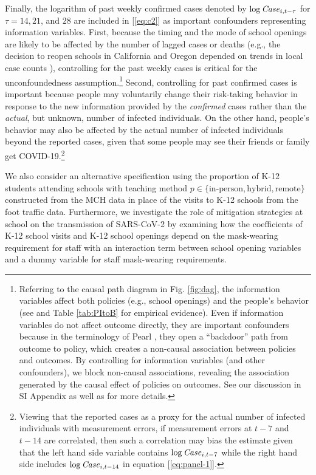 \documentclass[9pt,twocolumn,twoside,lineno]{pnas-new}
\begin{document}
Finally, the logarithm of past weekly confirmed cases denoted by $\log \text{\textit{Case}}_{i,t-\tau}$ for $\tau=14, 21$, and $28$  are included  in [\ref{eq:c2}] as important confounders representing information variables. First, because the timing and the mode of school openings are likely to be affected by the number of lagged cases or deaths (e.g., the decision to reopen schools in California and Oregon depended on trends in local case counts \citep{Goldhaber-Fiebert2020}), controlling for the past weekly cases is critical for the unconfoundedness assumption.\footnote{Referring to the causal path diagram in Fig. \ref{fig:dag}, the information variables affect both policies (e.g., school openings) and  the people's behavior (see \cite{chernozhukov2021} and Table \ref{tab:PItoB} for empirical evidence). Even if information variables do not affect outcome directly, they are important confounders because in the terminology of Pearl \cite{pearl:causality}, they open a ``backdoor'' path from outcome to policy, which creates a non-causal association between policies and outcomes. By controlling for information variables (and other confounders), we block non-causal associations, revealing the association generated by the causal effect of policies on outcomes. See our discussion in SI Appendix as well as \cite{pearl:causality} for more details.} Second, controlling for past confirmed cases is important because people may voluntarily change their risk-taking behavior in response to the new information provided by the \textit{confirmed} cases rather than the \textit{actual}, but unknown, number of infected individuals. On the other hand, people's behavior may also be affected by the actual number of infected individuals beyond the reported cases, given that some people may see their friends or family get COVID-19.\footnote{Viewing that the reported cases as a proxy for the actual number of infected individuals with measurement errors, if measurement errors at $t-7$ and $t-14$  are correlated, then such a correlation may bias the estimate given that the left hand side variable contains $\log \text{\textit{Case}}_{i,t-7}$ while the right hand side includes $\log \text{\textit{Case}}_{i,t-14}$ in equation [\ref{eq:panel-1}].}
 
We also consider an alternative specification  using  the proportion of K-12 students attending schools with teaching method $p\in \{\text{in-person},\text{hybrid},\text{remote}\}$ constructed from the MCH data in place of the visits to K-12 schools from the foot traffic data. Furthermore, we investigate the role of mitigation strategies at school on the transmission of SARS-CoV-2 by examining how the coefficients of K-12 school visits and K-12 school openings depend on the mask-wearing requirement for staff with an interaction term between school opening variables and a dummy variable for staff mask-wearing requirements.
 
\end{document}
